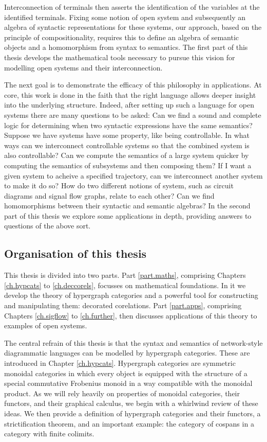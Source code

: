 Interconnection of terminals then asserts the identification of the variables at
the identified terminals. Fixing some notion of open system and subsequently an
algebra of syntactic representations for these systems, our approach, based on
the principle of compositionality, requires this to define an algebra of
semantic objects and a homomorphism from syntax to semantics. The first part of
this thesis develops the mathematical tools necessary to pursue this vision for
modelling open systems and their interconnection. 

The next goal is to demonstrate the efficacy of this philosophy in applications.
At core, this work is done in the faith that the right language allows deeper
insight into the underlying structure. Indeed, after setting up such a language
for open systems there are many questions to be asked: Can we find a sound and
complete logic for determining when two syntactic expressions have the same
semantics? Suppose we have systems have some property, like being controllable.
In what ways can we interconnect controllable systems so that the combined
system is also controllable? Can we compute the semantics of a large system
quicker by computing the semantics of subsystems and then composing them?  If I
want a given system to acheive a specified trajectory, can we interconnect
another system to make it do so? How do two different notions of system, such as
circuit diagrams and signal flow graphs, relate to each other? Can we find
homomorphisms between their syntactic and semantic algebras? In the second part
of this thesis we explore some applications in depth, providing answers to
questions of the above sort.


\subsection*{Organisation of this thesis}

This thesis is divided into two parts. Part \ref{part.maths}, comprising
Chapters \ref{ch.hypcats} to \ref{ch.deccorels}, focusses on mathematical
foundations. In it we develop the theory of hypergraph categories and a powerful
tool for constructing and manipulating them: decorated corelations. Part
\ref{part.apps}, comprising Chapters \ref{ch.sigflow} to \ref{ch.further}, then
discusses applications of this theory to examples of open systems.

The central refrain of this thesis is that the syntax and semantics of
network-style diagrammatic languages can be modelled by hypergraph categories.
These are introduced in Chapter \ref{ch.hypcats}. Hypergraph categories are
symmetric monoidal categories in which every object is equipped with the
structure of a special commutative Frobenius monoid in a way compatible with the
monoidal product. As we will rely heavily on properties of monoidal categories,
their functors, and their graphical calculus, we begin with a whirlwind review
of these ideas. We then provide a definition of hypergraph categories and their
functors, a strictification theorem, and an important example: the category of
cospans in a category with finite colimits.

